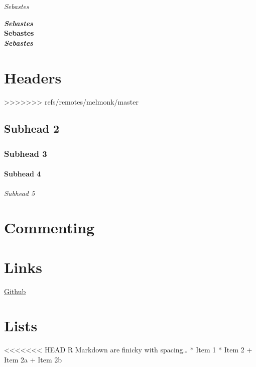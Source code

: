 \documentclass[12pt,]{article}
\begin{document}
\emph{Sebastes}

\textbf{\emph{Sebastes}}\\
\textbf{Sebastes}\\
\emph{\textbf{Sebastes}}

\section{Headers}\label{headers}
>>>>>>> refs/remotes/melmonk/master

\subsection{Subhead 2}\label{subhead-2}

\subsubsection{Subhead 3}\label{subhead-3}

\paragraph{Subhead 4}\label{subhead-4}

\emph{Subhead 5}

\section{Commenting}\label{commenting}

\section{Links}\label{links}

\href{www.github.com}{Github}

\section{Lists}\label{lists}

<<<<<<< HEAD
R Markdown are finicky with spacing\ldots{} * Item 1 * Item 2 + Item 2a
+ Item 2b
\end{document}
